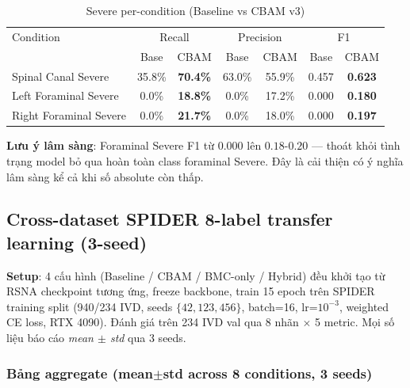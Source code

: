 \documentclass[11pt,a4paper]{article}
\newcommand{\best}[1]{\textcolor{best}{\textbf{#1}}}
\begin{document}
\begin{table}[h]
\centering
\caption{Severe per-condition (Baseline vs CBAM v3)}
\small
\begin{tabular}{@{}lcccccc@{}}
\toprule
\rowcolor{tablehdr}
Condition & \multicolumn{2}{c}{Recall} & \multicolumn{2}{c}{Precision} & \multicolumn{2}{c}{F1} \\
          & Base & CBAM & Base & CBAM & Base & CBAM \\
\midrule
Spinal Canal Severe   & 35.8\% & \best{70.4\%} & 63.0\% & 55.9\% & 0.457 & \best{0.623} \\
Left Foraminal Severe & 0.0\%  & \best{18.8\%} & 0.0\%  & 17.2\% & 0.000 & \best{0.180} \\
Right Foraminal Severe & 0.0\% & \best{21.7\%} & 0.0\%  & 18.0\% & 0.000 & \best{0.197} \\
\bottomrule
\end{tabular}
\end{table}

\noindent\textbf{Lưu ý lâm sàng}: Foraminal Severe F1 từ $0.000$ lên
$0.18$-$0.20$ --- thoát khỏi tình trạng model bỏ qua hoàn toàn class
foraminal Severe. Đây là cải thiện có ý nghĩa lâm sàng kể cả khi số
absolute còn thấp.

\subsection{Cross-dataset SPIDER 8-label transfer learning (3-seed)}

\noindent\textbf{Setup}: 4 cấu hình (Baseline / CBAM / BMC-only /
Hybrid) đều khởi tạo từ RSNA checkpoint tương ứng, freeze backbone,
train 15 epoch trên SPIDER training split (940/234 IVD, seeds
$\{42, 123, 456\}$, batch=16, lr=$10^{-3}$, weighted CE loss, RTX
4090). Đánh giá trên 234 IVD val qua 8 nhãn $\times$ 5 metric. Mọi
số liệu báo cáo \emph{mean $\pm$ std} qua 3 seeds.

\subsubsection*{Bảng aggregate (mean$\pm$std across 8 conditions, 3 seeds)}
\end{document}
